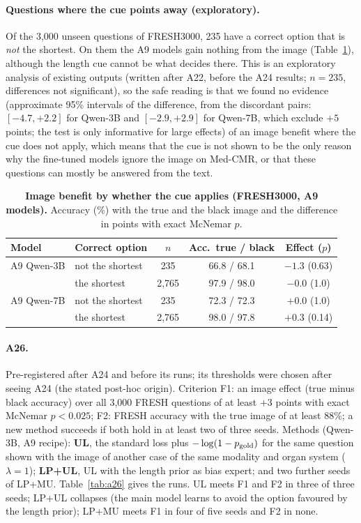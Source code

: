 \paragraph{Questions where the cue points away (exploratory).}
Of the 3{,}000 unseen questions of FRESH3000, 235 have a correct option that is \emph{not} the shortest.
On them the A9 models gain nothing from the image (Table~\ref{tab:contra}), although the length cue cannot be what decides there.
This is an exploratory analysis of existing outputs (written after A22, before the A24 results; $n=235$, differences not significant), so the safe reading is that we found no evidence (approximate 95\% intervals of the difference, from the discordant pairs: $[-4.7,+2.2]$ for Qwen-3B and $[-2.9,+2.9]$ for Qwen-7B, which exclude $+5$ points; the test is only informative for large effects) of an image benefit where the cue does not apply, which means that the cue is not shown to be the only reason why the fine-tuned models ignore the image on Med-CMR, or that these questions can mostly be answered from the text.

\begin{table}[tbp]
  \centering
  \footnotesize
  \setlength{\tabcolsep}{2.4pt}
  \begin{tabular}{@{}llccc@{}}
    \toprule
    Model & Correct option & $n$ & Acc.\ true / black & Effect ($p$) \\
    \midrule
    A9 Qwen-3B & not the shortest & 235 & 66.8 / 68.1 & $-1.3$ (0.63) \\
     & the shortest & 2{,}765 & 97.9 / 98.0 & $-0.0$ (1.0) \\
    A9 Qwen-7B & not the shortest & 235 & 72.3 / 72.3 & $+0.0$ (1.0) \\
     & the shortest & 2{,}765 & 98.0 / 97.8 & $+0.3$ (0.14) \\
    \bottomrule
  \end{tabular}
  \caption{\textbf{Image benefit by whether the cue applies (FRESH3000, A9 models).} Accuracy (\%) with the true and the black image and the difference in points with exact McNemar $p$.}
  \label{tab:contra}
\end{table}

\paragraph{A26.}
Pre-registered after A24 and before its runs; its thresholds were chosen after seeing A24 (the stated post-hoc origin).
Criterion F1: an image effect (true minus black accuracy) over all 3{,}000 FRESH questions of at least $+3$ points with exact McNemar $p<0.025$; F2: FRESH accuracy with the true image of at least $88\%$; a new method succeeds if both hold in at least two of three seeds.
Methods (Qwen-3B, A9 recipe): \textbf{UL}, the standard loss plus $-\log(1-p_{\rm gold})$ for the same question shown with the image of another case of the same modality and organ system ($\lambda=1$); \textbf{LP+UL}, UL with the length prior as bias expert; and two further seeds of LP+MU.
Table~\ref{tab:a26} gives the runs.
UL meets F1 and F2 in three of three seeds; LP+UL collapses (the main model learns to avoid the option favoured by the length prior); LP+MU meets F1 in four of five seeds and F2 in none.


